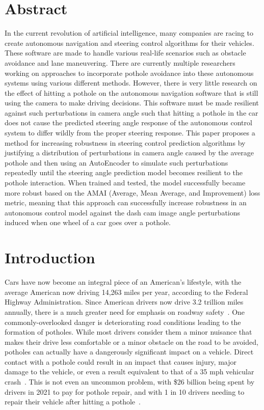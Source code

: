 \documentclass{article}
\begin{document}
\maketitle

\pagebreak

\section{Abstract}
In the current revolution of artificial intelligence, many companies are racing to create autonomous navigation and steering control algorithms for their vehicles. These software are made to handle various real-life scenarios such as obstacle avoidance and lane maneuvering. There are currently multiple researchers working on approaches to incorporate pothole avoidance into these autonomous systems using various different methods. However, there is very little research on the effect of hitting a pothole on the autonomous navigation software that is still using the camera to make driving decisions. This software must be made resilient against such perturbations in camera angle such that hitting a pothole in the car does not cause the predicted steering angle response of the autonomous control system to differ wildly from the proper steering response. This paper proposes a method for increasing robustness in steering control prediction algorithms by justifying a distribution of perturbations in camera angle caused by the average pothole and then using an AutoEncoder to simulate such perturbations repeatedly until the steering angle prediction model becomes resilient to the pothole interaction. When trained and tested, the model successfully became more robust based on the AMAI (Average, Mean Average, and Improvement) loss metric, meaning that this approach can successfully increase robustness in an autonomous control model against the dash cam image angle perturbations induced when one wheel of a car goes over a pothole.

\section{Introduction}

Cars have now become an integral piece of an American's lifestyle, with the average American now driving 14,263 miles per year, according to the Federal Highway Administration. Since American drivers now drive 3.2 trillion miles annually, there is a much greater need for emphasis on roadway safety~\cite{meyer_2023}. One commonly-overlooked danger is deteriorating road conditions leading to the formation of potholes. While most drivers consider them a minor nuisance that makes their drive less comfortable or a minor obstacle on the road to be avoided, potholes can actually have a dangerously significant impact on a vehicle. Direct contact with a pothole could result in an impact that causes injury, major damage to the vehicle, or even a result equivalent to that of a 35 mph vehicular crash~\cite{bodden_2021}. This is not even an uncommon problem, with \$26 billion being spent by drivers in 2021 to pay for pothole repair, and with 1 in 10 drivers needing to repair their vehicle after hitting a pothole~\cite{edmonds_2022}. 
\end{document}
